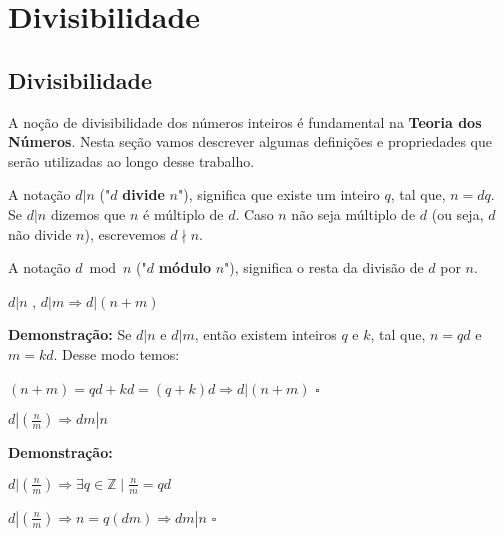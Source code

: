
\chapter{Divisibilidade} %

\label{Chapter2} %


\section{Divisibilidade}
A noção de divisibilidade dos números inteiros é fundamental na \textbf{Teoria dos Números}.
Nesta seção vamos descrever algumas definições e propriedades que serão utilizadas ao longo desse trabalho.

\begin{definition}
A notação $d|n$ ("$d$ \textbf{divide} $n$"), significa que existe um inteiro $q$, tal que, $n = dq$.
Se $d|n$ dizemos que $n$ é múltiplo de $d$. Caso $n$ não seja múltiplo de $d$ (ou seja, $d$ não divide $n$), escrevemos $d \nmid n$.
\end{definition}

\begin{definition}
A notação $d\bmod n$ ("$d$ \textbf{módulo} $n$"), significa o resta da divisão de $d$ por $n$.
\end{definition}

\begin{proposition}\label{divisibilidade_transitiva}
$d|n$ , $d|m \Rightarrow d|(n+m)$
\end{proposition}
\textbf{Demonstração:}
Se $d|n$ e $d|m$, então existem inteiros $q$ e $k$, tal que, $n = qd$ e $m = kd$. Desse modo temos:

$(n+m) = qd + kd = (q + k)d \Rightarrow d|(n+m) $ $\square$


\begin{proposition}\label{divisibilidade_fracao}
$d|(\frac{n}{m}) \Rightarrow dm|n$
\end{proposition}
\textbf{Demonstração:}

$d|(\frac{n}{m}) \Rightarrow \exists q \in \mathbb{Z} \mid \frac{n}{m} = qd$

$d|(\frac{n}{m}) \Rightarrow n = q(dm) \Rightarrow dm|n$ $\square$


